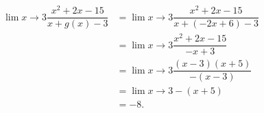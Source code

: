 \documentclass{ximera}
\begin{document}
\begin{problem}
\begin{enumerate}
\begin{explanation}
			\begin{align*}
				\displaystyle \lim{x\to 3} \dfrac{x^2+2x-15}{x + g(x) - 3} &= \displaystyle \lim{x\to 3} \dfrac{x^2+2x-15}{x + (-2x+6) - 3} \\
	&=\displaystyle \lim{x\to 3} \dfrac{x^2+2x-15}{-x+3} \\ 
	&=\displaystyle \lim{x\to 3} \dfrac{(x-3)(x+5)}{-(x-3)} \\ 
	&=\displaystyle \lim{x\to 3} -(x+5) \\ 
	&= -8.
			\end{align*}    
		\end{explanation}									
		
		\end{enumerate}
\end{problem}
\end{document}
